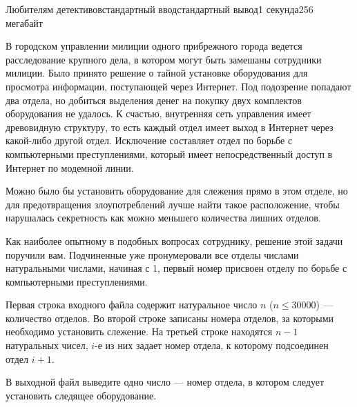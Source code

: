 \begin{problem}{Любителям детективов}{стандартный ввод}{стандартный вывод}{1 секунда}{256 мегабайт}

В городском управлении милиции одного прибрежного города ведется расследование крупного дела, в котором могут быть замешаны сотрудники милиции. Было принято решение о тайной установке оборудования для просмотра информации, поступающей через Интернет. Под подозрение попадают два отдела, но добиться выделения денег на покупку двух комплектов оборудования не удалось. К счастью, внутренняя сеть управления имеет древовидную структуру, то есть каждый отдел имеет выход в Интернет через какой-либо другой отдел. Исключение составляет отдел по борьбе с компьютерными преступлениями, который имеет непосредственный доступ в Интернет по модемной линии. 

Можно было бы установить оборудование для слежения прямо в этом отделе, но для предотвращения злоупотреблений лучше найти такое расположение, чтобы нарушалась секретность как можно меньшего количества лишних отделов. 

Как наиболее опытному в подобных вопросах сотруднику, решение этой задачи поручили вам. Подчиненные уже пронумеровали все отделы числами натуральными числами, начиная с 1, первый номер присвоен отделу по борьбе с компьютерными преступлениями. 

\InputFile
Первая строка входного файла содержит натуральное число $n$ ($n \le 30000$) --- количество отделов. Во второй строке записаны номера отделов, за которыми необходимо установить слежение. На третьей строке находятся $n - 1$ натуральных чисел, $i$-е из них задает номер отдела, к которому подсоединен отдел $i + 1$. 

\OutputFile
В выходной файл выведите одно число --- номер отдела, в котором следует установить следящее оборудование. 

\Example

\begin{example}
%
\end{example}

\end{problem}

